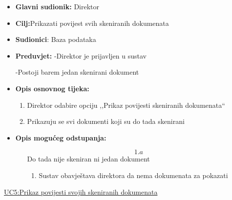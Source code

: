 \documentclass{article} %
\begin{document}
\begin{itemize}
	\item \textbf{Glavni sudionik:} Direktor
	
	
	\item \textbf{Cilj:}Prikazati povijest svih skeniranih dokumenata
	
	
	\item \textbf{Sudionici}: Baza podataka
	
	
	\item \textbf{Preduvjet:} -Direktor je prijavljen u sustav
	
	\qquad\qquad\quad  -Postoji barem jedan skenirani dokument
	
	\item \textbf{Opis osnovnog tijeka:} 
	\begin{enumerate}
		\item Direktor odabire opciju ,,Prikaz povijesti skeniranih dokumenata``
		
		
		\item Prikazuju se svi dokumenti koji su do tada skenirani
		
		
		
	\end{enumerate}
	\item \textbf{Opis mogućeg odstupanja:}
	
	\begin{enumerate}
		\item[$$1.a$$] Do tada nije skeniran ni jedan dokument
		
		\begin{enumerate}[label=\arabic*.]
			\item Sustav obavještava direktora da nema dokumenata za pokazati
			
		\end{enumerate}
	\end{enumerate}
\end{itemize}


\noindent\underline{UC5:Prikaz povijesti svojih skeniranih dokumenata}
\end{document}
